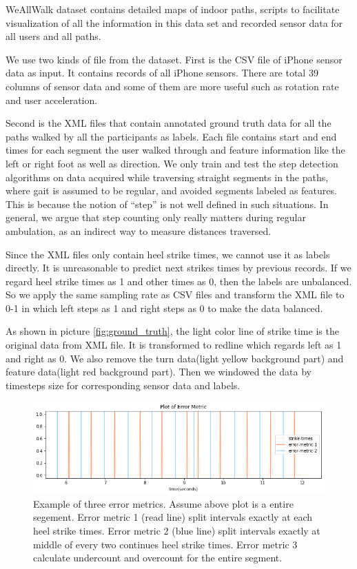 \documentclass[11pt]{article}
\begin{document}
WeAllWalk dataset contains detailed maps of indoor paths, scripts to facilitate visualization of all the information in this data set and recorded sensor data for all users and all paths.

We use two kinds of file from the dataset. First is the CSV file of iPhone sensor data as input. It contains records of all iPhone sensors. There are total 39 columns of sensor data and some of them are more useful such as rotation rate and user acceleration.

Second is the XML files that contain annotated ground truth data for all the paths walked by all the participants as labels. Each file contains start and end times for each segment the user walked through and feature information like the left or right foot as well as direction. We only train and test the step detection algorithms on data acquired while traversing straight segments in the paths, where gait is assumed to be regular, and avoided segments labeled as features. This is because the notion of “step” is not well defined in such situations. In general, we argue that step counting only really matters during regular ambulation, as an indirect way to measure distances traversed.

Since the XML files only contain heel strike times, we cannot use it as labels directly. It is unreasonable to predict next strikes times by previous records. If we regard heel strike times as 1 and other times as 0, then the labels are unbalanced. So we apply the same sampling rate as CSV files and transform the XML file to 0-1 in which left steps as 1 and right steps as 0 to make the data balanced.

As shown in picture \ref{fig:ground_truth}, the light color line of strike time is the original data from XML file. It is transformed to redline which regards left as 1 and right as 0. We also remove the turn data(light yellow background part) and feature data(light red background part). Then we windowed the data by timesteps size for corresponding sensor data and labels.

\begin{figure}[ht]
\centering
\includegraphics[scale=0.6]{error_metric}
\caption{Example of three error metrics. Assume above plot is a entire segement. Error metric 1 (read line) split intervals exactly at each heel strike times. Error metric 2 (blue line) split intervals exactly at middle of every two continues heel strike times. Error metric 3 calculate undercount and overcount for the entire segment.}
\label{fig:error_metric}
\end{figure}
\end{document}
